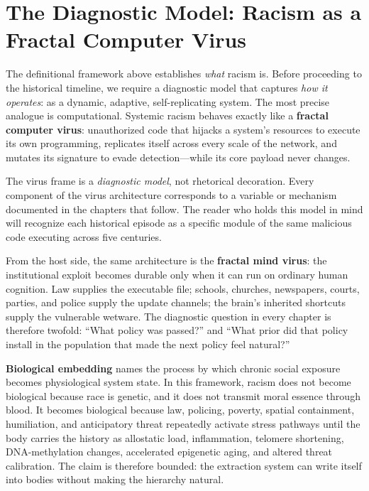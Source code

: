 \section{The Diagnostic Model: Racism as a Fractal Computer Virus}

The definitional framework above establishes \textit{what} racism is. Before proceeding to the historical timeline, we require a diagnostic model that captures \textit{how it operates}: as a dynamic, adaptive, self-replicating system. The most precise analogue is computational. Systemic racism behaves exactly like a \textbf{fractal computer virus}: unauthorized code that hijacks a system's resources to execute its own programming, replicates itself across every scale of the network, and mutates its signature to evade detection---while its core payload never changes.

The virus frame is a \textit{diagnostic model}, not rhetorical decoration. Every component of the virus architecture corresponds to a variable or mechanism documented in the chapters that follow. The reader who holds this model in mind will recognize each historical episode as a specific module of the same malicious code executing across five centuries.

From the host side, the same architecture is the \textbf{fractal mind virus}: the institutional exploit becomes durable only when it can run on ordinary human cognition. Law supplies the executable file; schools, churches, newspapers, courts, parties, and police supply the update channels; the brain's inherited shortcuts supply the vulnerable wetware. The diagnostic question in every chapter is therefore twofold: ``What policy was passed?'' and ``What prior did that policy install in the population that made the next policy feel natural?''

\begin{definition}
\label{def:biological_embedding}
\textbf{Biological embedding} names the process by which chronic social exposure
becomes physiological system state. In this framework, racism does not become
biological because race is genetic, and it does not transmit moral essence
through blood. It becomes biological because law, policing, poverty, spatial
containment, humiliation, and anticipatory threat repeatedly activate stress
pathways until the body carries the history as allostatic load, inflammation,
telomere shortening, DNA-methylation changes, accelerated epigenetic aging, and
altered threat calibration. The claim is therefore bounded: the extraction
system can write itself into bodies without making the hierarchy natural.
\end{definition}

